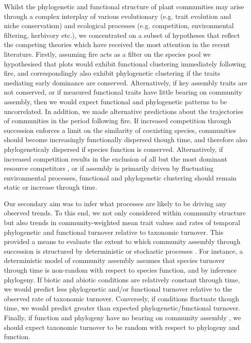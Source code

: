 Whilst the phylogenetic and functional structure of plant communities may arise through a complex interplay of various evolutionary (e.g. trait evolution and niche conservatism) and ecological processes (e.g. competition, environmental filtering, herbivory etc.), we concentrated on a subset of hypotheses that reflect the competing theories which have received the most attention in the recent literature. Firstly, assuming fire acts as a filter on the species pool we hypothesised that plots would exhibit functional clustering immediately following fire, and correspondingly also exhibit phylogenetic clustering if the traits mediating early dominance are conserved. Alternatively, if key assembly traits are not conserved, or if measured functional traits have little bearing on community assembly, then we would expect functional and phylogenetic patterns to be uncorrelated. In addition, we made alternative predictions about the trajectories of communities in the period following fire. If increased competition through succession enforces a limit on the similarity of coexisting species, communities should become increasingly functionally dispersed though time, and therefore also phylogeneticaly dispersed if species function is conserved. Alternatively, if increased competition results in the exclusion of all but the most dominant resource competitors \citep[\textit{sensu}][]{Mayfield2010}, or if assembly is primarily driven by fluctuating environmental processes, functional and phylogenetic clustering should remain static or increase through time.  

Our secondary aim was to infer what processes are likely to be driving any observed trends. To this end, we not only considered within community structure but also trends in community-weighted mean trait values and rates of temporal phylogenetic and functional turnover relative to taxonomic turnover. This provided a means to evaluate the extent to which community assembly through succession is structured by deterministic or stochastic processes \citep[e.g.][]{Swenson2012}. For instance, a deterministic model of community assembly assumes that species turnover through time is non-random with respect to species function, and by inference phylogeny. If biotic and abiotic conditions are relatively constant through time, we would predict less phylogenetic and/or functional turnover relative to the observed rate of taxonomic turnover. Conversely, if conditions fluctuate though time, we would predict greater than expected phylogenetic/functional turnover. Finally, if function and phylogeny have no bearing on community assembly \citep[i.e. a stochastic or neutral model \textit{sensu}][]{Hubbell2001}, we should expect taxonomic turnover to be random with respect to phylogeny and function.

